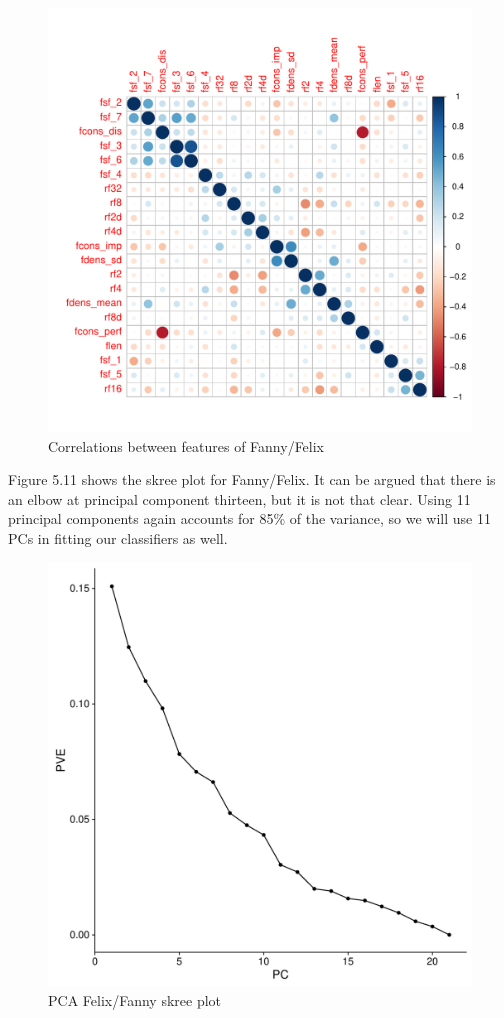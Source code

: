 \documentclass[12pt,twoside]{reedthesis}
\theoremstyle{definition}
\theoremstyle{definition}
\theoremstyle{definition}
\theoremstyle{remark}
\begin{document}
\begin{figure}[H]
\centering
\includegraphics[scale = .5]{images/cor_circles_f.pdf}
\caption{Correlations between features of Fanny/Felix}
\label{subd}
\end{figure}
Figure 5.11 shows the skree plot for Fanny/Felix. It can be argued that
there is an elbow at principal component thirteen, but it is not that
clear. Using 11 principal components again accounts for 85\% of the
variance, so we will use 11 PCs in fitting our classifiers as well.
\begin{figure}[H]
\centering
\includegraphics[scale = .5]{images/skree_f.pdf}
\caption{PCA Felix/Fanny skree plot}
\label{subd}
\end{figure}
\end{document}
